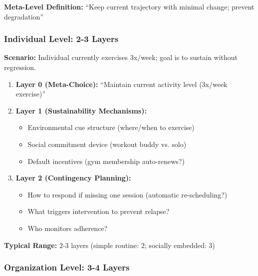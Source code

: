 \documentclass[11pt, a4paper]{article}
\begin{document}
\textbf{Meta-Level Definition:} ``Keep current trajectory with minimal change; prevent degradation''

\subsubsection{Individual Level: 2-3 Layers}

\begin{tcolorbox}[colback=gray!5!white, colframe=gray!75!black, title=Example: Habit Reinforcement (e.g., Regular Exercise)]

\textbf{Scenario:} Individual currently exercises 3x/week; goal is to sustain without regression.

\begin{enumerate}
    \item \textbf{Layer 0 (Meta-Choice):} ``Maintain current activity level (3x/week exercise)''

    \item \textbf{Layer 1 (Sustainability Mechanisms):}
    \begin{itemize}[nosep]
        \item Environmental cue structure (where/when to exercise)
        \item Social commitment device (workout buddy vs. solo)
        \item Default incentives (gym membership auto-renews?)
    \end{itemize}

    \item \textbf{Layer 2 (Contingency Planning):}
    \begin{itemize}[nosep]
        \item How to respond if missing one session (automatic re-scheduling?)
        \item What triggers intervention to prevent relapse?
        \item Who monitors adherence?
    \end{itemize}
\end{enumerate}

\textbf{Typical Range:} 2-3 layers (simple routine: 2; socially embedded: 3)

\end{tcolorbox}

\subsubsection{Organization Level: 3-4 Layers}
\end{document}
